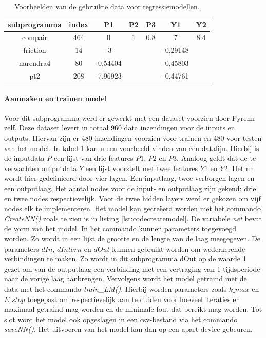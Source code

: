 		\begin{table}[]
			\centering
			\begin{tabular}{ccccccc}
				\hline
				subprogramma                   & index & P1       & P2 & P3  & Y1       & Y2  \\ \hline
				\multicolumn{1}{c|}{compair}   & 464   & 0        & 1  & 0.8 & 7        & 8.4 \\
				\multicolumn{1}{c|}{friction}  & 14    & -3       &    &     & -0,29148 &     \\
				\multicolumn{1}{c|}{narendra4} & 80    & -0,54404 &    &     & -0,45803 &     \\
				\multicolumn{1}{c|}{pt2}       & 208   & -7,96923 &    &     & -0,44761 &     \\ \hline
			\end{tabular}
			\caption{Voorbeelden van de gebruikte data voor regressiemodellen.}
			\label{tab:dataVoorbeelden}
		\end{table}
	
			\paragraph{Aanmaken en trainen model}
			Voor dit subprogramma werd er gewerkt met een dataset voorzien door Pyrenn zelf. Deze dataset levert in totaal 960 data inzendingen voor de inputs en outputs. Hiervan zijn er 480 inzendingen voorzien voor trainen en 480 voor testen van het model. In tabel \ref{tab:dataVoorbeelden} kan u een voorbeeld vinden van \'e\'en datalijn. Hierbij is de inputdata $P$ een lijst van drie features $P1$, $P2$ en $P3$. Analoog geldt dat de te verwachten outputdata $Y$ een lijst voorstelt met twee features $Y1$ en $Y2$. Het \gls{nn} wordt hier gedefinieerd door vier lagen. Een inputlaag, twee verborgen lagen en een outputlaag. Het aantal nodes voor de input- en outputlaag zijn gekend: drie en twee nodes respectievelijk. Voor de twee hidden layers werd er gekozen om vijf nodes elk te implementeren.
			Het model kan gecre\"eerd worden met het commando \textit{CreateNN()} zoals te zien is in listing \ref{lst:codecreatemodel}. De variabele \textit{net} bevat de vorm van het model. In het commando kunnen parameters toegevoegd worden. Zo wordt in een lijst de grootte en de lengte van de laag meegegeven. De parameters $dIn$, $dIntern$ en $dOut$ kunnen gebruikt worden om wederkerende verbindingen te maken. Zo wordt in dit subprogramma dOut op de waarde 1 gezet om van de outputlaag een verbinding met een vertraging van 1 tijdsperiode naar de vorige laag aanbrengen. Vervolgens wordt het model getraind met de data met het commando \textit{train\_LM()}. Hierbij worden parameters zoals $k\_max$ en $E\_stop$ toegepast om respectievelijk aan te duiden voor hoeveel iteraties er maximaal getraind mag worden en de minimale fout dat bereikt mag worden. Tot slot word het model ook opgeslagen in een \gls{csv}-bestand via het commando \textit{saveNN()}. Het uitvoeren van het model kan dan op een apart device gebeuren. 

